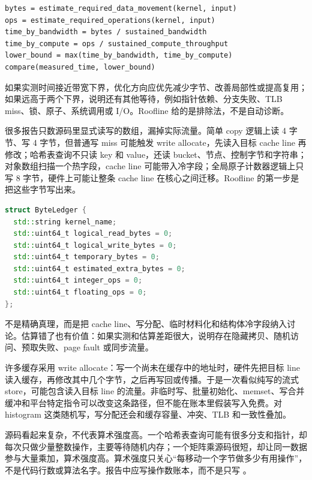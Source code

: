 \begin{lstlisting}[numbers=none,caption={Roofline 判断的抽象流程}]
bytes = estimate_required_data_movement(kernel, input)
ops = estimate_required_operations(kernel, input)
time_by_bandwidth = bytes / sustained_bandwidth
time_by_compute = ops / sustained_compute_throughput
lower_bound = max(time_by_bandwidth, time_by_compute)
compare(measured_time, lower_bound)
\end{lstlisting}

如果实测时间接近带宽下界，优化方向应优先减少字节、改善局部性或提高复用；如果远高于两个下界，说明还有其他等待，例如指针依赖、分支失败、TLB miss、锁、原子、系统调用或 I/O。Roofline 给的是排除法，不是自动诊断。

很多报告只数源码里显式读写的数组，漏掉实际流量。简单 copy 逻辑上读 4 字节、写 4 字节，但普通写 miss 可能触发 write allocate，先读入目标 cache line 再修改；哈希表查询不只读 key 和 value，还读 bucket、节点、控制字节和字符串；对象数组扫描一个热字段，cache line 可能带入冷字段；全局原子计数器逻辑上只写 8 字节，硬件上可能让整条 cache line 在核心之间迁移。Roofline 的第一步是把这些字节写出来。

\begin{lstlisting}[language=C++,caption={字节账本的最小形态}]
struct ByteLedger {
  std::string kernel_name;
  std::uint64_t logical_read_bytes = 0;
  std::uint64_t logical_write_bytes = 0;
  std::uint64_t temporary_bytes = 0;
  std::uint64_t estimated_extra_bytes = 0;
  std::uint64_t integer_ops = 0;
  std::uint64_t floating_ops = 0;
};
\end{lstlisting}

 不是精确真理，而是把 cache line、写分配、临时材料化和结构体冷字段纳入讨论。估算错了也有价值：如果实测和估算差距很大，说明存在隐藏拷贝、随机访问、预取失败、page fault 或同步流量。

许多缓存采用 write allocate：写一个尚未在缓存中的地址时，硬件先把目标 line 读入缓存，再修改其中几个字节，之后再写回或传播。于是一次看似纯写的流式 store，可能包含读入目标 line 的流量。非临时写、批量初始化、memset、写合并缓冲和平台特定指令可以改变这条路径，但不能在账本里假装写入免费。对 histogram 这类随机写，写分配还会和缓存容量、冲突、TLB 和一致性叠加。

源码看起来复杂，不代表算术强度高。一个哈希表查询可能有很多分支和指针，却每次只做少量整数操作，主要等待随机内存；一个矩阵乘源码很短，却让同一数据参与大量乘加，算术强度高。算术强度只关心“每移动一个字节做多少有用操作”，不是代码行数或算法名字。报告中应写操作数账本，而不是只写 。


